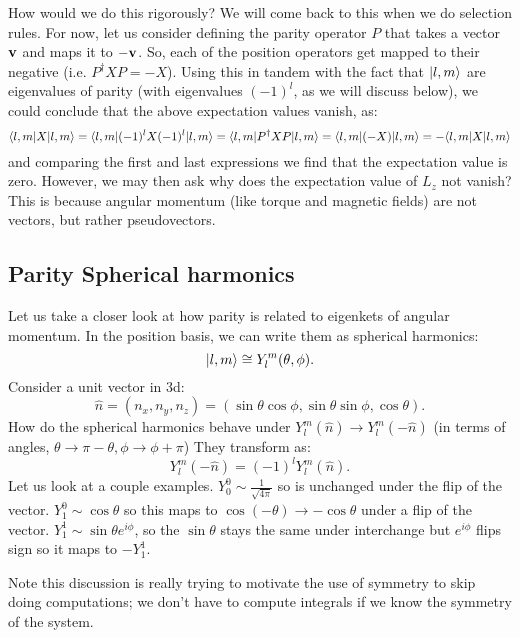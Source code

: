 How would we do this rigorously? We will come back to this when we do selection rules. For now, let us consider defining the parity operator $P$ that takes a vector $\mathbf{v}$ and maps it to $-\mathbf{v}$. So, each of the position operators get mapped to their negative (i.e. $P^\dagger XP= -X$). Using this in tandem with the fact that $\lvert l, m \rangle$ are eigenvalues of parity (with eigenvalues $(-1)^l$, as we will discuss below), we could conclude that the above expectation values vanish, as:
\begin{equation}
    \langle l, m \rvert X \lvert l, m \rangle = \langle l, m \rvert(-1)^l X (-1)^l \lvert l, m \rangle = \langle l, m \rvert P^\dagger X P\lvert l, m \rangle = \langle l, m \rvert(-X)\lvert l, m \rangle = -\langle l, m \rvert X\lvert l, m \rangle
\end{equation}
and comparing the first and last expressions we find that the expectation value is zero. However, we may then ask why does the expectation value of $L_z$ not vanish? This is because angular momentum (like torque and magnetic fields) are not vectors, but rather pseudovectors.

\subsection{Parity Spherical harmonics}
Let us take a closer look at how parity is related to eigenkets of angular momentum. In the position basis, we can write them as spherical harmonics:
\begin{equation}
    \ket{l, m} \cong Y_{l}^m(\theta, \phi).
\end{equation}
Consider a unit vector in 3d:
\begin{equation}
    \hat{n} = (n_x, n_y, n_z) = (\sin\theta\cos\phi, \sin\theta\sin\phi, \cos\theta).
\end{equation}
How do the spherical harmonics behave under $Y_l^m(\hat{n}) \to Y_l^m(-\hat{n})$ (in terms of angles, $\theta \to \pi - \theta, \phi \to \phi + \pi$) They transform as:
\begin{equation}
    Y_l^m(-\hat{n}) = (-1)^lY_{l}^m(\hat{n}).
\end{equation}
Let us look at a couple examples. $Y_0^0 \sim \frac{1}{\sqrt{4\pi}}$ so is unchanged under the flip of the vector. $Y_1^0 \sim \cos\theta$ so this maps to $\cos(-\theta) \to -\cos\theta$ under a flip of the vector. $Y_1^1 \sim \sin\theta e^{i\phi}$, so the $\sin\theta$ stays the same under interchange but $e^{i\phi}$ flips sign so it maps to $-Y_1^1$. 

Note this discussion is really trying to motivate the use of symmetry to skip doing computations; we don't have to compute integrals if we know the symmetry of the system.

